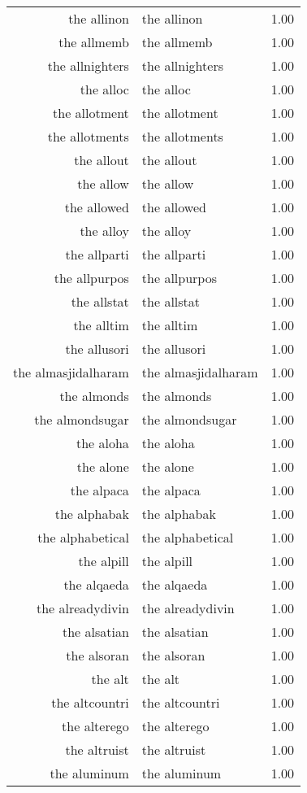 \begin{table}[ht]
\begin{tabular}{rlr}
  the allinon & the allinon & 1.00 \\ 
  the allmemb & the allmemb & 1.00 \\ 
  the allnighters & the allnighters & 1.00 \\ 
  the alloc & the alloc & 1.00 \\ 
  the allotment & the allotment & 1.00 \\ 
  the allotments & the allotments & 1.00 \\ 
  the allout & the allout & 1.00 \\ 
  the allow & the allow & 1.00 \\ 
  the allowed & the allowed & 1.00 \\ 
  the alloy & the alloy & 1.00 \\ 
  the allparti & the allparti & 1.00 \\ 
  the allpurpos & the allpurpos & 1.00 \\ 
  the allstat & the allstat & 1.00 \\ 
  the alltim & the alltim & 1.00 \\ 
  the allusori & the allusori & 1.00 \\ 
  the almasjidalharam & the almasjidalharam & 1.00 \\ 
  the almonds & the almonds & 1.00 \\ 
  the almondsugar & the almondsugar & 1.00 \\ 
  the aloha & the aloha & 1.00 \\ 
  the alone & the alone & 1.00 \\ 
  the alpaca & the alpaca & 1.00 \\ 
  the alphabak & the alphabak & 1.00 \\ 
  the alphabetical & the alphabetical & 1.00 \\ 
  the alpill & the alpill & 1.00 \\ 
  the alqaeda & the alqaeda & 1.00 \\ 
  the alreadydivin & the alreadydivin & 1.00 \\ 
  the alsatian & the alsatian & 1.00 \\ 
  the alsoran & the alsoran & 1.00 \\ 
  the alt & the alt & 1.00 \\ 
  the altcountri & the altcountri & 1.00 \\ 
  the alterego & the alterego & 1.00 \\ 
  the altruist & the altruist & 1.00 \\ 
  the aluminum & the aluminum & 1.00 \\ 

\end{tabular}
\end{table}
